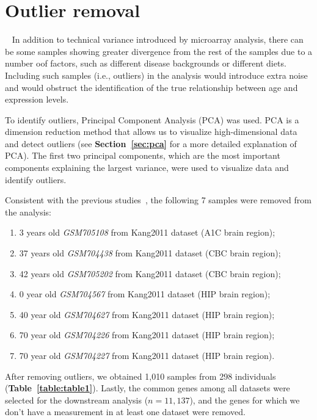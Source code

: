 \section{Outlier removal}~\label{sec:out.rm}
In addition to technical variance introduced by microarray analysis, 
there can be some samples showing greater divergence from the rest of the samples due to a number oof factors,
such as different disease backgrounds or different diets.
Including such samples (i.e., outliers) in the analysis would introduce extra noise and would obstruct the identification of the true relationship between age and expression levels.

To identify outliers, Principal Component Analysis (PCA) was used. 
PCA is a dimension reduction method that allows us to visualize high-dimensional data and detect outliers (see \textbf{Section~\ref{sec:pca}} for a more detailed explanation of PCA).
The first two principal components, which are the most important components explaining the largest variance, were used to visualize data and identify outliers.

Consistent with the previous studies~\autocite{Donertas2017,Donertas2018}, the following 7 samples were removed from the analysis: 
\begin{enumerate}
    \item 3 years old \textit{GSM705108} from Kang2011 dataset (A1C brain region);
    \item 37 years old \textit{GSM704438} from Kang2011 dataset (CBC brain region);
    \item 42 years old \textit{GSM705202} from Kang2011 dataset (CBC brain region);
    \item 0 year old \textit{GSM704567} from Kang2011 dataset (HIP brain region);
    \item 40 year old \textit{GSM704627} from Kang2011 dataset (HIP brain region);
    \item 70 year old \textit{GSM704226} from Kang2011 dataset (HIP brain region);
    \item 70 year old \textit{GSM704227} from Kang2011 dataset (HIP brain region).
\end{enumerate}

After removing outliers, we obtained 1,010 samples from 298 individuals (\textbf{Table~\ref{table:table1}}).
Lastly, the common genes among all datasets were selected for the downstream analysis ($n=11,137$), 
and the genes for which we don't have a measurement in at least one dataset were removed.

